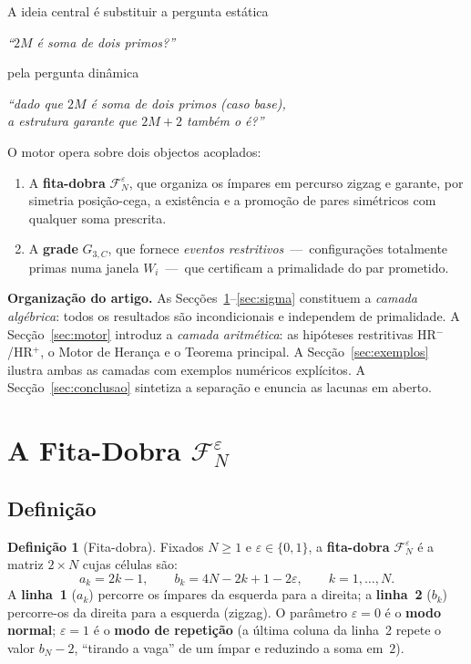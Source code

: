\documentclass[12pt, a4paper]{article}
\theoremstyle{plain}
\theoremstyle{definition}
\newtheorem{definition}[theorem]{Definição}
\theoremstyle{remark}
\begin{document}
	A ideia central é substituir a pergunta estática
	\begin{center}
		\emph{``$2M$ é soma de dois primos?''}
	\end{center}
	pela pergunta dinâmica
	\begin{center}
		\emph{``dado que $2M$ é soma de dois primos (caso base),\\
			a estrutura garante que $2M+2$ também o é?''}
	\end{center}
	
	O motor opera sobre dois objectos acoplados:
	\begin{enumerate}
		\item A \textbf{fita-dobra} $\mathcal{F}_N^\varepsilon$, que
		organiza os ímpares em percurso zigzag e garante, por
		simetria posição-cega, a existência e a promoção de pares
		simétricos com qualquer soma prescrita.
		\item A \textbf{grade} $G_{3,C}$, que fornece \emph{eventos
			restritivos}~---~configurações totalmente primas numa janela
		$W_i$~---~que certificam a primalidade do par prometido.
	\end{enumerate}
	
	\medskip
	\noindent\textbf{Organização do artigo.}
	As Secções~\ref{sec:fita}--\ref{sec:sigma} constituem a
	\emph{camada algébrica}: todos os resultados são incondicionais e
	independem de primalidade.
	A Secção~\ref{sec:motor} introduz a \emph{camada aritmética}: as
	hipóteses restritivas HR$^-$/HR$^+$, o Motor de Herança e o Teorema
	principal.
	A Secção~\ref{sec:exemplos} ilustra ambas as camadas com exemplos
	numéricos explícitos.
	A Secção~\ref{sec:conclusao} sintetiza a separação e enuncia as
	lacunas em aberto.
	
	\section{A Fita-Dobra $\mathcal{F}_N^\varepsilon$}
	\label{sec:fita}
	
	\subsection{Definição}
	
	\begin{definition}[Fita-dobra]
		\label{def:fita}
		Fixados $N\geq1$ e $\varepsilon\in\{0,1\}$, a
		\textbf{fita-dobra} $\mathcal{F}_N^\varepsilon$ é a matriz
		$2\times N$ cujas células são:
		\[
		a_k = 2k-1,
		\qquad
		b_k = 4N - 2k + 1 - 2\varepsilon,
		\qquad k=1,\dots,N.
		\]
		A \textbf{linha~1} ($a_k$) percorre os ímpares da esquerda para a
		direita; a \textbf{linha~2} ($b_k$) percorre-os da direita para a
		esquerda (zigzag).  O parâmetro $\varepsilon=0$ é o
		\textbf{modo normal}; $\varepsilon=1$ é o \textbf{modo de
			repetição} (a última coluna da linha~2 repete o valor $b_N-2$,
		``tirando a vaga'' de um ímpar e reduzindo a soma em~$2$).
	\end{definition}
	
\end{document}
